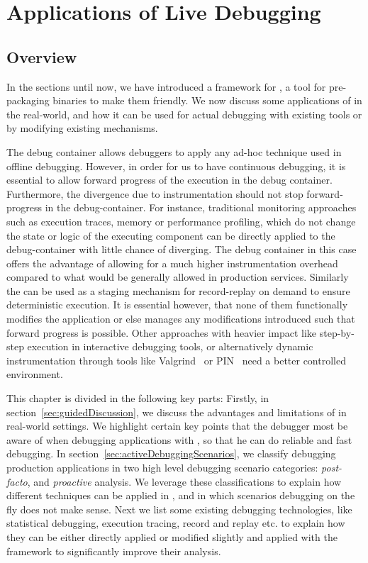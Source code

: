 \chapter{Applications of Live Debugging}
\label{ch:activedebugging}

\section{Overview}
\label{sec:guided_overview}

In the sections until now, we have introduced a framework for \livedebugging, a tool for pre-packaging binaries to make them \livedebugging friendly. 
We now discuss some applications of \livedebugging in the real-world, and how it can be used for actual debugging with existing tools or by modifying existing mechanisms.

The debug container allows debuggers to apply any ad-hoc technique used in offline debugging.
However, in order for us to have continuous debugging, it is essential to allow forward progress of the execution in the debug container. 
Furthermore, the divergence due to instrumentation should not stop forward-progress in the debug-container.
For instance, traditional monitoring approaches such as execution traces, memory or performance profiling,  which do not change the state or logic of the executing component can be directly applied to the debug-container with little chance of \debugcontainer diverging. 
The debug container in this case offers the advantage of allowing for a much higher instrumentation overhead compared to what would be generally allowed in production services.
Similarly the \debugcontainer can be used as a staging mechanism for record-replay on demand to ensure deterministic execution.
It is essential however, that none of them functionally modifies the application or else manages any modifications introduced such that forward progress is possible.
Other approaches with heavier impact like step-by-step execution in interactive debugging tools, or alternatively dynamic instrumentation through tools like Valgrind~\cite{valgrind} or PIN~\cite{pin} need a better controlled environment.

This chapter is divided in the following key parts: Firstly, in section~\ref{sec:guidedDiscussion}, we discuss the advantages and limitations of \parikshan in real-world settings.
We highlight certain key points that the debugger most be aware of when debugging applications with \parikshan, so that he can do reliable and fast debugging. 
In section~\ref{sec:activeDebuggingScenarios}, we classify debugging production applications in two high level debugging scenario categories: \emph{post-facto}, and \emph{proactive} analysis.
We leverage these classifications to explain how different techniques can be applied in \parikshan, and in which scenarios debugging on the fly does not make sense.
Next we list some existing debugging technologies, like statistical debugging, execution tracing, record and replay etc. to explain how they can be either directly applied or modified slightly and applied with the \parikshan framework to significantly improve their analysis.

